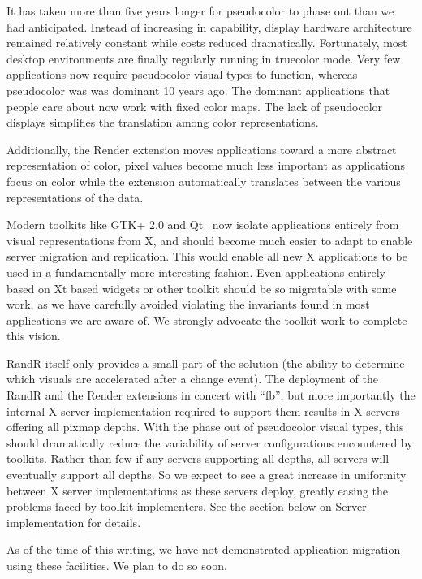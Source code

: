 \documentclass[twocolumn]{article}
\begin{document}
It has taken more than five years longer for pseudocolor to phase out than
we had anticipated. Instead of increasing in capability, display hardware
architecture remained relatively constant while costs reduced dramatically.
Fortunately, most desktop environments are finally regularly running in
truecolor mode.  Very few applications now require pseudocolor visual types
to function, whereas pseudocolor was was dominant 10 years ago.  The dominant
applications that people care about now work with fixed color maps.  The
lack of pseudocolor displays simplifies the translation among color
representations.

Additionally, the Render extension moves applications toward a more abstract
representation of color, pixel values become much less important as
applications focus on color while the extension automatically translates
between the various representations of the data.  

Modern toolkits like GTK+ 2.0 and Qt~\cite{qt} now isolate
applications entirely from visual representations from X, and should
become much easier to adapt to enable server migration and replication.
This would enable all new X applications to be used in a fundamentally more
interesting fashion.  Even applications entirely based on Xt based
widgets or other toolkit should be so migratable with some work, as
we have carefully avoided violating the invariants found in most
applications we are aware of. We strongly advocate the toolkit work
to complete this vision.

RandR itself only provides a small part of the solution (the ability
to determine which visuals are accelerated after a change event).  The
deployment of the RandR and the Render extensions in concert with
``fb'', but more importantly the internal X server implementation
required to support them results in X servers offering all pixmap
depths.  With the phase out of pseudocolor visual types, this should
dramatically reduce the variability of server configurations
encountered by toolkits.  Rather than few if any servers supporting
all depths, all servers will eventually support all depths. So we
expect to see a great increase in uniformity between X server
implementations as these servers deploy, greatly easing the problems
faced by toolkit implementers. See the section below on Server
implementation for details.

As of the time of this writing, we have not demonstrated application
migration using these facilities. We plan to do so soon.
\end{document}
